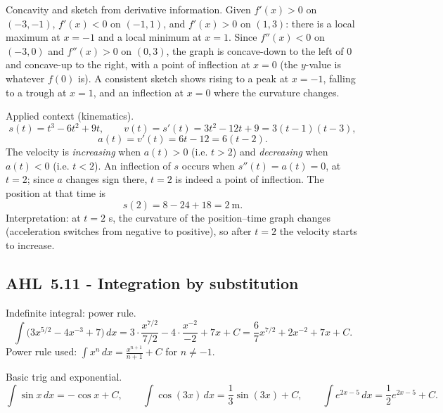 \documentclass[11pt]{article}
\def\textbf#1{#1}%
\newcommand{\tocsubsection}[1]{\subsection{#1}}
\begin{document}
\begin{solution}
\textbf{Concavity and sketch from derivative information.}
Given $f'(x)>0$ on $(-3,-1)$, $f'(x)<0$ on $(-1,1)$, and $f'(x)>0$ on $(1,3)$:
there is a local maximum at $x=-1$ and a local minimum at $x=1$.
Since $f''(x)<0$ on $(-3,0)$ and $f''(x)>0$ on $(0,3)$, the graph is concave-down to the left of $0$ and concave-up to the right, with a point of inflection at $x=0$ (the $y$-value is whatever $f(0)$ is).
A consistent sketch shows rising to a peak at $x=-1$, falling to a trough at $x=1$, and an inflection at $x=0$ where the curvature changes.
\end{solution}

\begin{solution}
\textbf{Applied context (kinematics).}
\[
s(t)=t^{3}-6t^{2}+9t,\qquad v(t)=s'(t)=3t^{2}-12t+9=3(t-1)(t-3),
\]
\[
a(t)=v'(t)=6t-12=6(t-2).
\]
The velocity is \emph{increasing} when $a(t)>0$ (i.e. $t>2$) and \emph{decreasing} when $a(t)<0$ (i.e. $t<2$).
An inflection of $s$ occurs when $s''(t)=a(t)=0$, at $t=2$; since $a$ changes sign there, $t=2$ is indeed a point of inflection.
The position at that time is
\[
s(2)=8-24+18=2\ \text{m}.
\]
Interpretation: at $t=2$ s, the curvature of the position–time graph changes (acceleration switches from negative to positive), so after $t=2$ the velocity starts to increase.
\end{solution}

\tocsubsection{AHL 5.11 - Integration by substitution}


\begin{solution}
\textbf{Indefinite integral: power rule.}
\[
\int \!\bigl(3x^{5/2}-4x^{-3}+7\bigr)\,dx
=3\cdot\frac{x^{7/2}}{7/2}-4\cdot\frac{x^{-2}}{-2}+7x+C
=\frac{6}{7}x^{7/2}+2x^{-2}+7x+C .
\]
Power rule used: $\displaystyle \int x^{n}\,dx=\frac{x^{n+1}}{n+1}+C$ for $n\ne -1$.
\end{solution}

\begin{solution}
\textbf{Basic trig and exponential.}
\[
\int \sin x\,dx=-\cos x+C,\qquad
\int \cos(3x)\,dx=\frac{1}{3}\sin(3x)+C,\qquad
\int e^{2x-5}\,dx=\frac{1}{2}e^{2x-5}+C .
\]
\end{solution}
\end{document}
